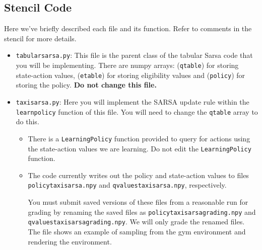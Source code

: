 \documentclass[12pt]{article}
\begin{document}
\subsection{Stencil Code}
Here we've briefly described each file and its function. Refer to comments in the stencil for more details.

\begin{itemize}
\item \texttt{tabular\textunderscore sarsa.py}: This file is the parent class of the tabular Sarsa code that you will be implementing. There are numpy arrays: (\texttt{qtable}) for storing state-action values,  (\texttt{etable}) for storing eligibility values and  (\texttt{policy}) for storing the policy. \textbf{Do not change this file.}

\item \texttt{taxi\textunderscore sarsa.py}: Here you will implement the SARSA update rule within the \texttt{learn\textunderscore policy} function of this file. You will need to change the \texttt{qtable} array to do this. 
\begin{itemize}
\item There is a \texttt{LearningPolicy} function provided to query for actions using the state-action values we are learning. Do not edit the \texttt{LearningPolicy} function.
\item The code currently writes out the policy and state-action values to files \\ \texttt{policy\textunderscore taxi\textunderscore sarsa.npy} and \texttt{qvalues\textunderscore taxi\textunderscore sarsa.npy}, respectively.

You must submit saved versions of these files from a reasonable run for grading by renaming the saved files as \texttt{policy\textunderscore taxi\textunderscore sarsa\textunderscore grading.npy} and  \\ \texttt{qvalues\textunderscore taxi\textunderscore sarsa\textunderscore grading.npy}. We will only grade the renamed files.
The file shows an example of sampling from the gym environment and rendering the environment.
\end{itemize}


\end{itemize}
\end{document}
